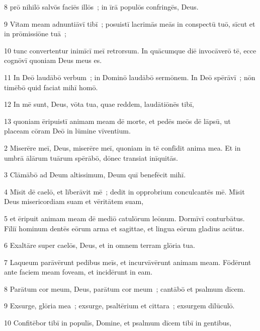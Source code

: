 \psalmVerse
  {\phantom{00}8}
  {prō nihilō salvōs faciēs illōs~; in īrā populōs confringēs, Deus.}


\psalmVerse
  {\phantom{00}9}
  {Vītam meam adnuntiāvī tibī~; posuistī lacrimās meās in conspectū tuō, sīcut et in prōmissiōne tuā~;}


\psalmVerse
  {\phantom{0}10}
  {tunc convertentur inimīcī meī retrorsum. In quācumque diē invocāverō tē, ecce cognōvī quoniam Deus meus es.}


\psalmVerse
  {\phantom{0}11}
  {In Deō laudābō verbum~; in Dominō laudābō sermōnem. In Deō spērāvī~; nōn timēbō quid faciat mihī homō.}


\psalmVerse
  {\phantom{0}12}
  {In mē sunt, Deus, vōta tua, quae reddem, laudātiōnēs tibī,}


\psalmVerse
  {\phantom{0}13}
  {quoniam ēripuistī animam meam dē morte, et pedēs meōs dē lāpsū, ut placeam cōram Deō in lūmine vīventium.}



\psalmVerse
  {\phantom{00}2}
  {Miserēre meī, Deus, miserēre meī, quoniam in tē confīdit anima mea. Et in umbrā ālārum tuārum spērābō, dōnec transiat inīquitās.}


\psalmVerse
  {\phantom{00}3}
  {Clāmābō ad Deum altissimum, Deum quī benefēcit mihī.}


\psalmVerse
  {\phantom{00}4}
  {Mīsit dē caelō, et līberāvit mē~; dedit in opprobrium conculcantēs mē. Mīsit Deus misericordiam suam et vēritātem suam,}


\psalmVerse
  {\phantom{00}5}
  {et ēripuit animam meam dē mediō catulōrum leōnum. Dormīvī conturbātus. Fīliī hominum dentēs eōrum arma et sagittae, et lingua eōrum gladius acūtus.}


\psalmVerse
  {\phantom{00}6}
  {Exaltāre super caelōs, Deus, et in omnem terram glōria tua.}


\psalmVerse
  {\phantom{00}7}
  {Laqueum parāvērunt pedibus meīs, et incurvāvērunt animam meam. Fōdērunt ante faciem meam foveam, et incidērunt in eam.}


\psalmVerse
  {\phantom{00}8}
  {Parātum cor meum, Deus, parātum cor meum~; cantābō et psalmum dīcem.}


\psalmVerse
  {\phantom{00}9}
  {Exsurge, glōria mea~; exsurge, psaltērium et cittara~; exsurgem dīlūculō.}


\psalmVerse
  {\phantom{0}10}
  {Confitēbor tibī in populīs, Domine, et psalmum dīcem tibī in gentibus,}


